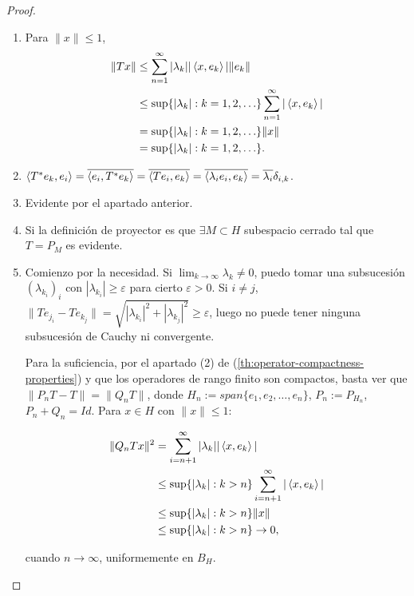 \begin{proof}\hfill
  \begin{enumerate}
    \item Para $\|x\|\le 1$, 
      \begin{align*}
        \|Tx\| & \le \sum_{n=1}^{\infty} |\lambda_k| |\left\langle x,e_k\right\rangle| \|e_k\| \\
               & \le \sup \{|\lambda_k|:k=1,2,\ldots\} \sum_{n=1}^{\infty} |\left\langle x,e_k\right\rangle| \\
               & = \sup \{|\lambda_k|:k=1,2,\ldots\} \|x\| \\
               & = \sup \{|\lambda_k|:k=1,2,\ldots\}
      .\end{align*}
    \item $\left\langle T^*e_k,e_i\right\rangle= \overline{\left\langle e_i,T^*e_k\right\rangle}=
      \overline{\left\langle Te_i,e_k\right\rangle}= \overline{\left\langle\lambda_i
      e_i,e_k\right\rangle}=\overline{\lambda_i} \delta_{i,k}$.

    \item Evidente por el apartado anterior.
    \item Si la definición de proyector es que $\exists M\subset H$ subespacio
      cerrado tal que $T=P_M$ es evidente.
    \item Comienzo por la necesidad. Si $\lim_{k \to \infty} \lambda_k \neq 0$,
      puedo tomar una subsucesión $(\lambda_{k_i})_i$ con $|\lambda_{k_i}|\ge
      \varepsilon$ para cierto $\varepsilon>0$. Si $i\neq j$,
      $\|Te_{j_i}-Te_{k_j}\|=\sqrt{|\lambda_{k_i}|^2+|\lambda_{k_j}|^2}\ge \varepsilon$,
      luego no puede tener ninguna subsucesión de Cauchy ni convergente.

      Para la suficiencia, por el apartado (2) de
      (\ref{th:operator-compactness-properties}) y que los operadores de rango
      finito son compactos, basta ver que $\|P_nT-T\|=\|Q_nT\|$, donde
      $H_n:=span \{e_1,e_2,\ldots,e_n\}$, $P_n:=P_{H_n}$, $P_n+Q_n=Id$. Para
      $x\in H$ con $\|x\|\le 1$:

      \begin{align*}
        \|Q_nTx\|^2 & =\sum_{i=n+1}^{\infty} |\lambda_k| |\left\langle x,e_k\right\rangle|\\
                    & \le \sup \{|\lambda_k|: k>n\}\sum_{i=n+1}^{\infty} |\left\langle x,e_k\right\rangle|\\
                    & \le \sup \{|\lambda_k|: k>n\}\|x\|\\
                    & \le \sup \{|\lambda_k|: k>n\} \to 0
      ,\end{align*}

      cuando $n\to \infty$, uniformemente en $B_H$.
  \end{enumerate}
\end{proof}


